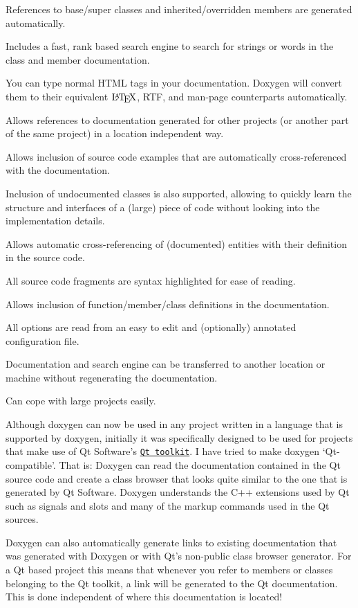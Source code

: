 \begin{DoxyItemize}
\item References to base/super classes and inherited/overridden members are generated automatically. 
\item Includes a fast, rank based search engine to search for strings or words in the class and member documentation. 
\item You can type normal HTML tags in your documentation. Doxygen will convert them to their equivalent $\mbox{\LaTeX}$, RTF, and man-\/page counterparts automatically. 
\item Allows references to documentation generated for other projects (or another part of the same project) in a location independent way. 
\item Allows inclusion of source code examples that are automatically cross-\/referenced with the documentation. 
\item Inclusion of undocumented classes is also supported, allowing to quickly learn the structure and interfaces of a (large) piece of code without looking into the implementation details. 
\item Allows automatic cross-\/referencing of (documented) entities with their definition in the source code. 
\item All source code fragments are syntax highlighted for ease of reading. 
\item Allows inclusion of function/member/class definitions in the documentation. 
\item All options are read from an easy to edit and (optionally) annotated configuration file. 
\item Documentation and search engine can be transferred to another location or machine without regenerating the documentation. 
\item Can cope with large projects easily. 
\end{DoxyItemize}

Although doxygen can now be used in any project written in a language that is supported by doxygen, initially it was specifically designed to be used for projects that make use of Qt Software's \href{http://www.trolltech.com/products/qt.html}{\tt Qt toolkit}. I have tried to make doxygen `Qt-\/compatible'. That is: Doxygen can read the documentation contained in the Qt source code and create a class browser that looks quite similar to the one that is generated by Qt Software. Doxygen understands the C++ extensions used by Qt such as signals and slots and many of the markup commands used in the Qt sources.

Doxygen can also automatically generate links to existing documentation that was generated with Doxygen or with Qt's non-\/public class browser generator. For a Qt based project this means that whenever you refer to members or classes belonging to the Qt toolkit, a link will be generated to the Qt documentation. This is done independent of where this documentation is located! 
